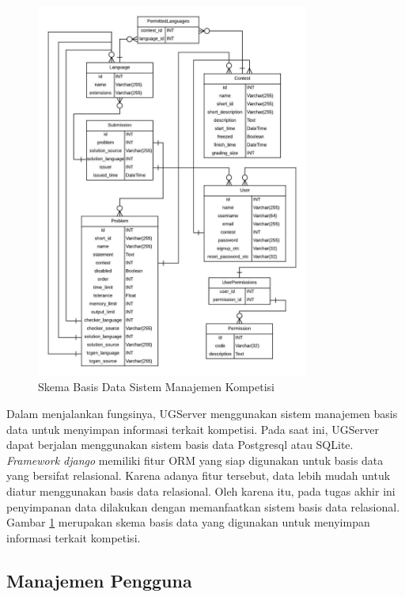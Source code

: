 \begin{figure}[ht!]
    \centering
    \includegraphics[width=0.8\textwidth]{images/dbschemas}
    \caption{Skema Basis Data Sistem Manajemen Kompetisi}
    \label{fig:dbschemas}
\end{figure}

\par Dalam menjalankan fungsinya, UGServer menggunakan sistem manajemen basis data untuk menyimpan informasi terkait kompetisi. Pada saat ini, UGServer dapat berjalan menggunakan sistem basis data Postgresql atau SQLite. \textit{Framework django} memiliki fitur ORM yang siap digunakan untuk basis data yang bersifat relasional. Karena adanya fitur tersebut, data lebih mudah untuk diatur menggunakan basis data relasional. Oleh karena itu, pada tugas akhir ini penyimpanan data dilakukan dengan memanfaatkan sistem basis data relasional. Gambar \ref{fig:dbschemas} merupakan skema basis data yang digunakan untuk menyimpan informasi terkait kompetisi.

\subsection{Manajemen Pengguna} \label{subsec:user-management}

